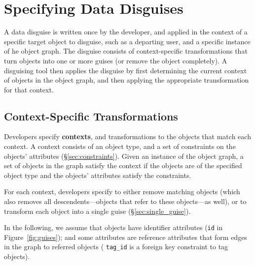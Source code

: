 \section{Specifying Data Disguises}
\label{sec:policies}

A data disguise is written once by the developer, and applied in the context of a specific target
object to disguise, such as a departing user, and a specific instance of he object graph.
%
The disguise consists of context-specific transformations that turn objects into one or
more guises (or remove the object completely). 
%
A disguising tool then applies the disguise by first determining the current context of objects in the object
graph, and then applying the appropriate transformation for that context.

\subsection{Context-Specific Transformations}
\label{sec:context}

Developers specify \textbf{contexts}, and transformations to the objects that match each context. 
%
%
%
A context consists of an object type, and a set of constraints on the objects' attributes
(\S\ref{sec:constraints}).
Given an instance of the object graph, a set of objects in the graph
satisfy the context if the objects are of the specified object type and the objects'
attributes satisfy the constraints.

For each context, developers specify to either remove matching objects (which also removes all
descendents---objects that refer to these objects---as well), or to transform each object into
a single guise (\S\ref{sec:single_guise}). 

%
In the following, we assume that objects have identifier attributes (\eg \texttt{id} in Figure~\ref{fig:guises}); and
some attributes are reference attributes that form edges in the graph to referred objects (\eg
\texttt{tag\_id} is a foreign key constraint to tag objects).

